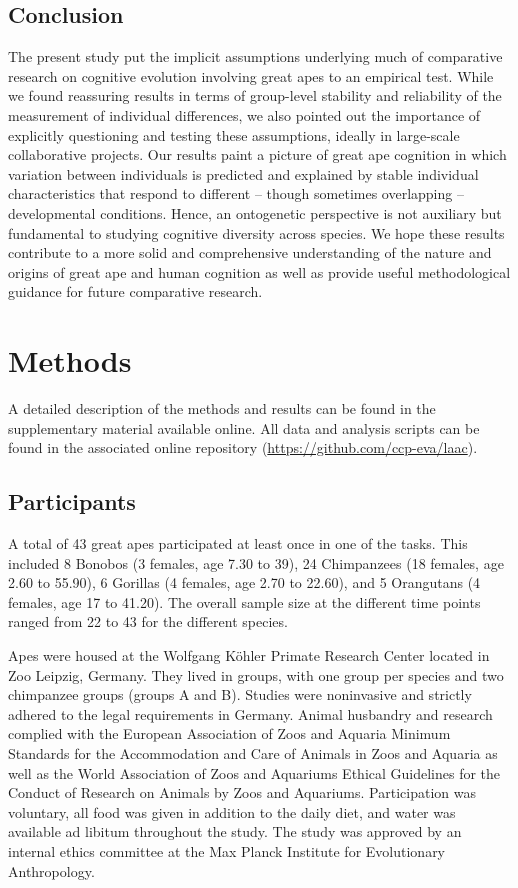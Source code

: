 \documentclass[
  man,floatsintext]{apa6}
\begin{document}
\hypertarget{conclusion}{%
\subsection{Conclusion}\label{conclusion}}

The present study put the implicit assumptions underlying much of comparative research on cognitive evolution involving great apes to an empirical test. While we found reassuring results in terms of group-level stability and reliability of the measurement of individual differences, we also pointed out the importance of explicitly questioning and testing these assumptions, ideally in large-scale collaborative projects. Our results paint a picture of great ape cognition in which variation between individuals is predicted and explained by stable individual characteristics that respond to different -- though sometimes overlapping -- developmental conditions. Hence, an ontogenetic perspective is not auxiliary but fundamental to studying cognitive diversity across species. We hope these results contribute to a more solid and comprehensive understanding of the nature and origins of great ape and human cognition as well as provide useful methodological guidance for future comparative research.

\hypertarget{methods}{%
\section{Methods}\label{methods}}

A detailed description of the methods and results can be found in the supplementary material available online. All data and analysis scripts can be found in the associated online repository (\url{https://github.com/ccp-eva/laac}).

\hypertarget{participants}{%
\subsection{Participants}\label{participants}}

A total of 43 great apes participated at least once in one of the tasks. This included 8 Bonobos (3 females, age 7.30 to 39), 24 Chimpanzees (18 females, age 2.60 to 55.90), 6 Gorillas (4 females, age 2.70 to 22.60), and 5 Orangutans (4 females, age 17 to 41.20). The overall sample size at the different time points ranged from 22 to 43 for the different species.

Apes were housed at the Wolfgang Köhler Primate Research Center located in Zoo Leipzig, Germany. They lived in groups, with one group per species and two chimpanzee groups (groups A and B). Studies were noninvasive and strictly adhered to the legal requirements in Germany. Animal husbandry and research complied with the European Association of Zoos and Aquaria Minimum Standards for the Accommodation and Care of Animals in Zoos and Aquaria as well as the World Association of Zoos and Aquariums Ethical Guidelines for the Conduct of Research on Animals by Zoos and Aquariums. Participation was voluntary, all food was given in addition to the daily diet, and water was available ad libitum throughout the study. The study was approved by an internal ethics committee at the Max Planck Institute for Evolutionary Anthropology.
\end{document}
